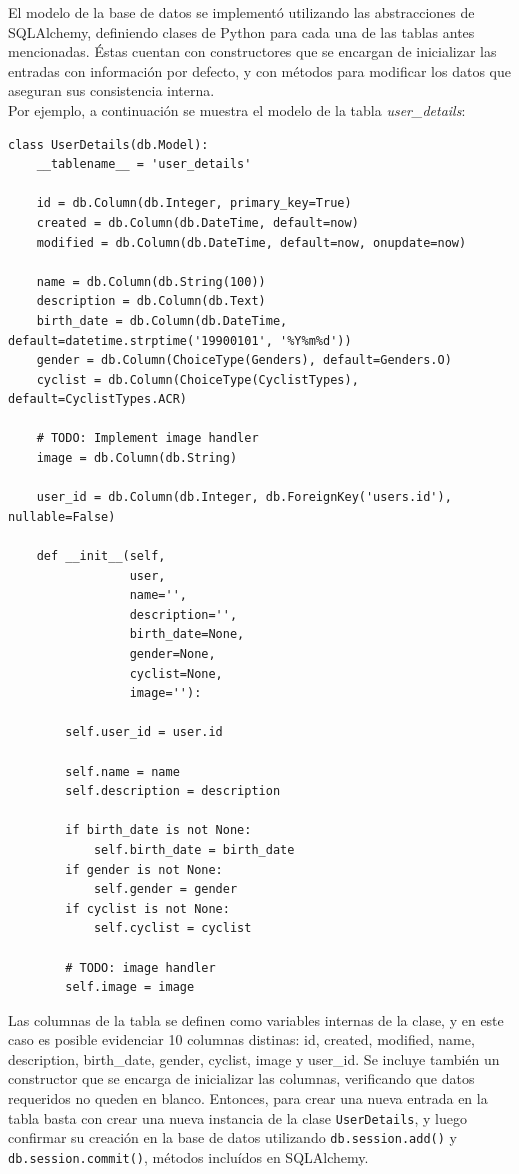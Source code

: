 \documentclass[11pt,letterpaper]{article}
\begin{document}
El modelo de la base de datos se implementó utilizando las abstracciones de SQLAlchemy, definiendo clases de Python para cada una de las tablas antes mencionadas. Éstas cuentan con constructores que se encargan de inicializar las entradas con información por defecto, y con métodos para modificar los datos que aseguran sus consistencia interna.\\

Por ejemplo, a continuación se muestra el modelo de la tabla \emph{user\_details}:
\begin{lstlisting}[title=Modelo de la tabla \emph{user\_details}]
class UserDetails(db.Model):
    __tablename__ = 'user_details'

    id = db.Column(db.Integer, primary_key=True)
    created = db.Column(db.DateTime, default=now)
    modified = db.Column(db.DateTime, default=now, onupdate=now)

    name = db.Column(db.String(100))
    description = db.Column(db.Text)
    birth_date = db.Column(db.DateTime, default=datetime.strptime('19900101', '%Y%m%d'))
    gender = db.Column(ChoiceType(Genders), default=Genders.O)
    cyclist = db.Column(ChoiceType(CyclistTypes), default=CyclistTypes.ACR)

    # TODO: Implement image handler
    image = db.Column(db.String)

    user_id = db.Column(db.Integer, db.ForeignKey('users.id'), nullable=False)

    def __init__(self,
                 user,
                 name='',
                 description='',
                 birth_date=None,
                 gender=None,
                 cyclist=None,
                 image=''):

        self.user_id = user.id

        self.name = name
        self.description = description

        if birth_date is not None:
            self.birth_date = birth_date
        if gender is not None:
            self.gender = gender
        if cyclist is not None:
            self.cyclist = cyclist

        # TODO: image handler
        self.image = image
\end{lstlisting}

Las columnas de la tabla se definen como variables internas de la clase, y en este caso es posible evidenciar 10 columnas distinas: id, created, modified, name, description, birth\_date, gender, cyclist, image y user\_id. Se incluye también un constructor que se encarga de inicializar las columnas, verificando que datos requeridos no queden en blanco. Entonces, para crear una nueva entrada en la tabla basta con crear una nueva instancia de la clase \texttt{UserDetails}, y luego confirmar su creación en la base de datos utilizando \texttt{db.session.add()} y \texttt{db.session.commit()}, métodos incluídos en SQLAlchemy.\\
\end{document}
